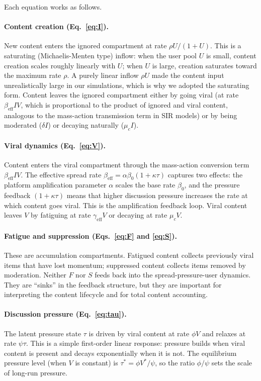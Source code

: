 \documentclass[11pt]{article}
\begin{document}
Each equation works as follows.

\paragraph{Content creation (Eq.~\ref{eq:I}).} New content enters the ignored compartment at rate $\rho U / (1+U)$. This is a saturating (Michaelis-Menten type) inflow: when the user pool $U$ is small, content creation scales roughly linearly with $U$; when $U$ is large, creation saturates toward the maximum rate $\rho$. A purely linear inflow $\rho U$ made the content input unrealistically large in our simulations, which is why we adopted the saturating form. Content leaves the ignored compartment either by going viral (at rate $\beta_{\mathrm{eff}} I V$, which is proportional to the product of ignored and viral content, analogous to the mass-action transmission term in SIR models) or by being moderated ($\delta I$) or decaying naturally ($\mu_c I$).

\paragraph{Viral dynamics (Eq.~\ref{eq:V}).} Content enters the viral compartment through the mass-action conversion term $\beta_{\mathrm{eff}} I V$. The effective spread rate $\beta_{\mathrm{eff}} = \alpha \beta_0 (1+\kappa\tau)$ captures two effects: the platform amplification parameter $\alpha$ scales the base rate $\beta_0$, and the pressure feedback $(1+\kappa\tau)$ means that higher discussion pressure increases the rate at which content goes viral. This is the amplification feedback loop. Viral content leaves $V$ by fatiguing at rate $\gamma_{\mathrm{eff}} V$ or decaying at rate $\mu_c V$.

\paragraph{Fatigue and suppression (Eqs.~\ref{eq:F} and \ref{eq:S}).} These are accumulation compartments. Fatigued content collects previously viral items that have lost momentum; suppressed content collects items removed by moderation. Neither $F$ nor $S$ feeds back into the spread-pressure-user dynamics. They are ``sinks'' in the feedback structure, but they are important for interpreting the content lifecycle and for total content accounting.

\paragraph{Discussion pressure (Eq.~\ref{eq:tau}).} The latent pressure state $\tau$ is driven by viral content at rate $\phi V$ and relaxes at rate $\psi\tau$. This is a simple first-order linear response: pressure builds when viral content is present and decays exponentially when it is not. The equilibrium pressure level (when $V$ is constant) is $\tau^* = \phi V^* / \psi$, so the ratio $\phi/\psi$ sets the scale of long-run pressure.
\end{document}

